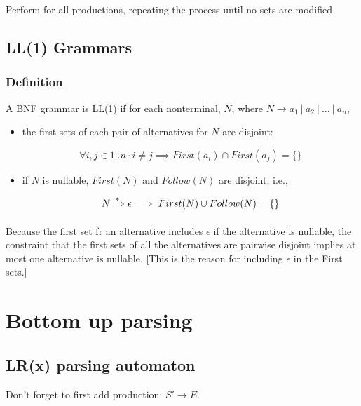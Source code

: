 \documentclass[fontsize=10pt,a4paper]{article}
\begin{document}
\begin{multicols}{3}
    Perform for all productions, repeating the process until no sets are modified



    \subsection{LL(1) Grammars}

    \subsubsection{Definition}

    A BNF grammar is LL(1) if for each nonterminal, $N$, where $N \rightarrow a_1 ~\vert~ a_2 ~\vert~ \dots ~\vert~ a_n$,

    \begin{itemize}
        \item the first sets of each pair of alternatives for $N$ are disjoint:

        \[\forall i, j \in 1..n \cdot i \neq j \implies First(a_i) \cap First(a_j) = \{\}\]

        \item if $N$ is nullable, $First(N)$ and $Follow(N)$ are disjoint, i.e.,

        \[N \xRightarrow{*} \epsilon \implies First(N) \cup Follow(N) = \{\}\]

    \end{itemize}

    Because the first set fr an alternative includes $\epsilon$ if the alternative is nullable, the constraint that the first sets of all the alternatives are pairwise disjoint implies at most one alternative is nullable. [This is the reason for including $\epsilon$ in the First sets.]
    

    \section{Bottom up parsing}

    \subsection{LR(x) parsing automaton}

    Don't forget to first add production: $S' \rightarrow E$.


\end{multicols}
\end{document}
